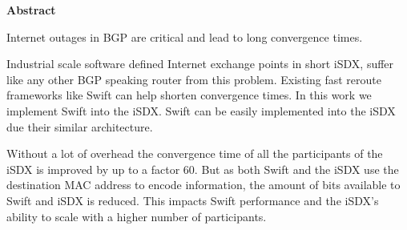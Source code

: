 \clearpage
\null
\vfil %
\thispagestyle{plain}
\begin{center}\textbf{Abstract}\end{center}
Internet outages in BGP are critical and lead to long convergence times. 

Industrial scale software defined Internet exchange points in short iSDX, suffer like any other BGP speaking router from this problem. Existing fast reroute frameworks like Swift can help shorten convergence times. In this work we implement Swift into the iSDX. Swift can be easily implemented into the iSDX due their similar architecture. 

Without a lot of overhead the convergence time of all the participants of the iSDX is improved by up to a factor 60. But as both Swift and the iSDX use the destination MAC address to encode information, the amount of bits available to Swift and iSDX is reduced. This impacts Swift performance and the iSDX's ability to scale with a higher number of participants.
\vfil
\clearpage 
